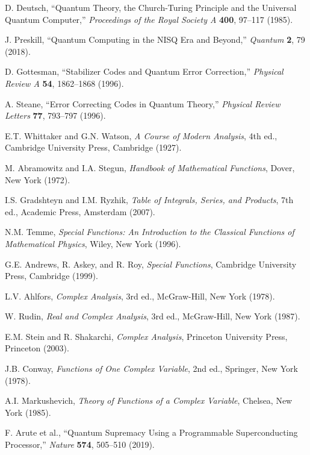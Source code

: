 \documentclass[11pt]{article}
\theoremstyle{plain}
\theoremstyle{definition}
\theoremstyle{remark}
\begin{document}
\begin{thebibliography}{99}
 D. Deutsch, ``Quantum Theory, the Church-Turing Principle and the Universal Quantum Computer,'' \emph{Proceedings of the Royal Society A} \textbf{400}, 97--117 (1985).

 J. Preskill, ``Quantum Computing in the NISQ Era and Beyond,'' \emph{Quantum} \textbf{2}, 79 (2018).

 D. Gottesman, ``Stabilizer Codes and Quantum Error Correction,'' \emph{Physical Review A} \textbf{54}, 1862--1868 (1996).

 A. Steane, ``Error Correcting Codes in Quantum Theory,'' \emph{Physical Review Letters} \textbf{77}, 793--797 (1996).

 E.T. Whittaker and G.N. Watson, \emph{A Course of Modern Analysis}, 4th ed., Cambridge University Press, Cambridge (1927).

 M. Abramowitz and I.A. Stegun, \emph{Handbook of Mathematical Functions}, Dover, New York (1972).

 I.S. Gradshteyn and I.M. Ryzhik, \emph{Table of Integrals, Series, and Products}, 7th ed., Academic Press, Amsterdam (2007).

 N.M. Temme, \emph{Special Functions: An Introduction to the Classical Functions of Mathematical Physics}, Wiley, New York (1996).

 G.E. Andrews, R. Askey, and R. Roy, \emph{Special Functions}, Cambridge University Press, Cambridge (1999).

 L.V. Ahlfors, \emph{Complex Analysis}, 3rd ed., McGraw-Hill, New York (1978).

 W. Rudin, \emph{Real and Complex Analysis}, 3rd ed., McGraw-Hill, New York (1987).

 E.M. Stein and R. Shakarchi, \emph{Complex Analysis}, Princeton University Press, Princeton (2003).

 J.B. Conway, \emph{Functions of One Complex Variable}, 2nd ed., Springer, New York (1978).

 A.I. Markushevich, \emph{Theory of Functions of a Complex Variable}, Chelsea, New York (1985).

 F. Arute et al., ``Quantum Supremacy Using a Programmable Superconducting Processor,'' \emph{Nature} \textbf{574}, 505--510 (2019).


\end{thebibliography}
\end{document}
